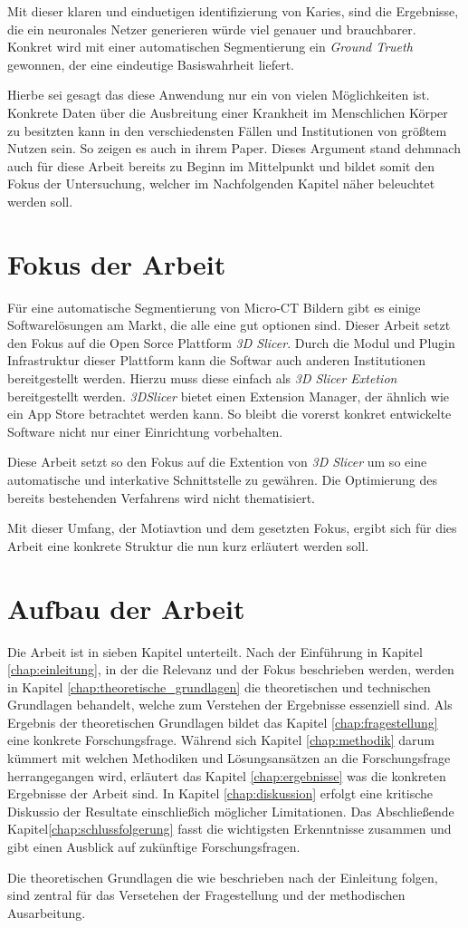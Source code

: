Mit dieser klaren und einduetigen identifizierung von Karies, sind die Ergebnisse,
die ein neuronales Netzer generieren würde viel genauer und brauchbarer. Konkret
wird mit einer automatischen Segmentierung ein \textit{Ground Trueth} gewonnen, der
eine eindeutige Basiswahrheit liefert.

Hierbe sei gesagt das diese Anwendung nur ein von vielen Möglichkeiten ist.
Konkrete Daten über die Ausbreitung einer Krankheit im Menschlichen Körper zu
besitzten kann in den verschiedensten Fällen und Institutionen von größtem
Nutzen sein. So zeigen es auch \citet{de20083d} in ihrem Paper. Dieses Argument stand
dehmnach auch für diese Arbeit bereits zu Beginn im Mittelpunkt und bildet somit
den Fokus der Untersuchung, welcher im Nachfolgenden Kapitel näher beleuchtet
werden soll.

\section{Fokus der Arbeit}
\label{sec:fokus_der-arbeit} Für eine automatische Segmentierung von Micro-CT
Bildern gibt es einige Softwarelösungen am Markt, die alle eine gut optionen sind.
Dieser Arbeit setzt den Fokus auf die Open Sorce Plattform \textit{3D Slicer}.
Durch die Modul und Plugin Infrastruktur dieser Plattform kann die Softwar auch
anderen Institutionen bereitgestellt werden. Hierzu muss diese einfach als \textit{3D
Slicer Extetion} bereitgestellt werden. \textit{3DSlicer} bietet einen Extension
Manager, der ähnlich wie ein App Store betrachtet werden kann. So bleibt die
vorerst konkret entwickelte Software nicht nur einer Einrichtung vorbehalten.

Diese Arbeit setzt so den Fokus auf die Extention von \textit{3D Slicer} um so eine
automatische und interkative Schnittstelle zu gewähren. Die Optimierung des
bereits bestehenden Verfahrens wird nicht thematisiert.

Mit dieser Umfang, der Motiavtion und dem gesetzten Fokus, ergibt sich für dies
Arbeit eine konkrete Struktur die nun kurz erläutert werden soll.

\section{Aufbau der Arbeit}
\label{sec:aufbau_der_arbeit} Die Arbeit ist in sieben Kapitel unterteilt. Nach der
Einführung in Kapitel \ref{chap:einleitung}, in der die Relevanz und der Fokus
beschrieben werden, werden in Kapitel \ref{chap:theoretische_grundlagen} die theoretischen
und technischen Grundlagen behandelt, welche zum Verstehen der Ergebnisse
essenziell sind. Als Ergebnis der theoretischen Grundlagen bildet das Kapitel \ref{chap:fragestellung}
eine konkrete Forschungsfrage. Während sich Kapitel \ref{chap:methodik} darum
kümmert mit welchen Methodiken und Lösungsansätzen an die Forschungsfrage
herrangegangen wird, erläutert das Kapitel \ref{chap:ergebnisse} was die konkreten
Ergebnisse der Arbeit sind. In Kapitel \ref{chap:diskussion} erfolgt eine
kritische Diskussio der Resultate einschließich möglicher Limitationen. Das Abschließende
Kapitel\ref{chap:schlussfolgerung} fasst die wichtigsten Erkenntnisse zusammen
und gibt einen Ausblick auf zukünftige Forschungsfragen.

Die theoretischen Grundlagen die wie beschrieben nach der Einleitung folgen, sind
zentral für das Versetehen der Fragestellung und der methodischen Ausarbeitung.